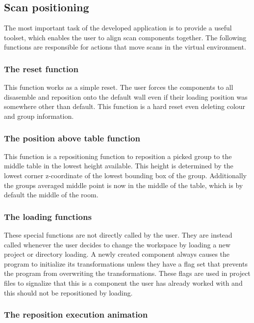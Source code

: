 \documentclass[hyperref,english,bachelorofscience,bibnum,twoside]{cgvpub}
\begin{document}
\subsection{Scan positioning}

The most important task of the developed application is to provide a useful toolset, which enables the user to align scan components together. The following functions are responsible for actions that move scans in the virtual environment.

\subsubsection{The reset function}

This function works as a simple reset. The user forces the components to all disasemble and reposition onto the default wall even if their loading position was somewhere other than default. This function is a hard reset even deleting colour and group information.

\subsubsection{The position above table function}

This function is a repositioning function to reposition a picked group to the middle table in the lowest height available. This height is determined by the lowest corner z-coordinate of the lowest bounding box of the group. Additionally the groups averaged middle point is now in the middle of the table, which is by default the middle of the room.

\subsubsection{The loading functions}

These special functions are not directly called by the user. They are instead called whenever the user decides to change the workspace by loading a new project or directory loading. A newly created component always causes the program to initialize its transformations unless they have a flag set that prevents the program from overwriting the transformations. These flags are used in project files to signalize that this is a component the user has already worked with and this should not be repositioned by loading. 

\subsubsection{The reposition execution animation}
\end{document}

